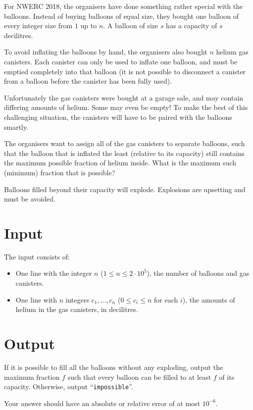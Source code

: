 
%
For NWERC 2018, the organisers have done something rather special with the balloons.
Instead of buying balloons of equal size, they bought one balloon of every integer size from $1$ up to $n$. A balloon of size $s$ has a capacity of $s$ decilitres.

To avoid inflating the balloons by hand, the organisers also bought $n$ helium gas canisters. Each canister can only be used to inflate one balloon, and must be emptied completely into that balloon
(it is not possible to disconnect a canister from a balloon before the canister has been fully used).

Unfortunately the gas canisters were bought at a garage sale, and may contain differing amounts of helium. Some may even be empty! To make the best of this challenging situation, the canisters will have to be paired with the balloons smartly.

The organisers want to assign all of the gas canisters to separate balloons, such that the balloon that is inflated the least (relative to its capacity) still contains the maximum possible fraction of helium inside.
What is the maximum such (minimum) fraction that is possible?

Balloons filled beyond their capacity will explode. Explosions are upsetting and must be avoided.

\section*{Input}
The input consists of:

\begin{itemize}
  \item One line with the integer $n$ ($1 \le n \le 2\cdot10^5$), the number of balloons and gas canisters.
  \item One line with $n$ integers $c_1, \ldots, c_n$ ($0 \le c_i \le n$ for each $i$), the amounts of helium in the gas canisters, in decilitres.
\end{itemize}

\section*{Output}

If it is possible to fill all the balloons without any exploding, output the maximum fraction $f$ such that every balloon can be filled to at least $f$ of its capacity.  Otherwise, output ``\texttt{impossible}''.

Your answer should have an absolute or relative error of at most $10^{-6}$.
